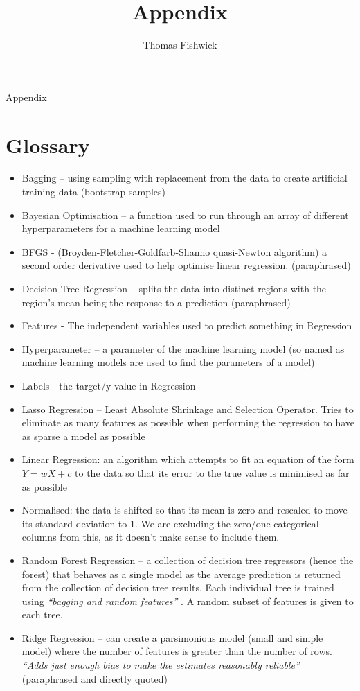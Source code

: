\documentclass[a4pape, 11pt, english]{article}
\title{Appendix}
\author{Thomas Fishwick}
\begin{document}
\begin{center}
\huge
Appendix
\end{center}

\section{Glossary}
\begin{itemize}
	\item Bagging – using sampling with replacement from the data to create artificial training data (bootstrap samples)
	\item Bayesian Optimisation – a function used to run through an array of different hyperparameters for a machine learning model
	\item BFGS - (Broyden-Fletcher-Goldfarb-Shanno quasi-Newton algorithm) a second order derivative used to help optimise linear regression.\citep{brownlee_gentle_2021} (paraphrased)
	\item Decision Tree Regression – splits the data into distinct regions with the region’s mean being the response to a prediction \citep{james_gareth_introduction_2021} (paraphrased)
	\item Features - The independent variables used to predict something in Regression
	\item Hyperparameter – a parameter of the machine learning model (so named as machine learning models are used to find the parameters of a model)
	\item Labels - the target/y value in Regression
	\item Lasso Regression – Least Absolute Shrinkage and Selection Operator. Tries to eliminate as many features as possible when performing the regression to have as sparse a model as possible \citep{stephanie_lasso_2015}
	\item Linear Regression: an algorithm which attempts to fit an equation of the form $Y = wX + c$ to the data so that its error to the true value is minimised as far as possible
	\item Normalised: the data is shifted so that its mean is zero and rescaled to move its standard deviation to 1. We are excluding the zero/one categorical columns from this, as it doesn’t make sense to include them.
	\item Random Forest Regression – a collection of decision tree regressors (hence the forest) that behaves as a single model as the average prediction is returned from the collection of decision tree results. Each individual tree is trained using \textit{“bagging and random features”} \citep{schapire_robert_random_2001}. A random subset of features is given to each tree.
	\item Ridge Regression – can create a parsimonious model (small and simple model) where the number of features is greater than the number of rows. \textit{“Adds just enough bias to make the estimates reasonably reliable”} \citep{stephanie_ridge_2017} (paraphrased and directly quoted) 
\end{itemize}
\end{document}
